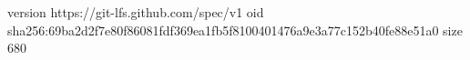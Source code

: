 version https://git-lfs.github.com/spec/v1
oid sha256:69ba2d2f7e80f86081fdf369ea1fb5f8100401476a9e3a77c152b40fe88e51a0
size 680
